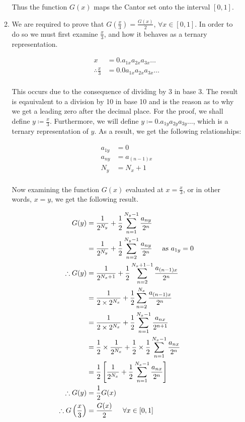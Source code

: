 \documentclass[a4paper]{article}
\begin{document}
\begin{enumerate}[label=\textbf{\arabic*.}]
\begin{enumerate}
		Thus the function $G(x)$ maps the Cantor set onto the interval $[0,1]$.

		\bigbreak

		\item We are required to prove that $G\left(\frac{x}{3}\right) = \frac{G(x)}{2}$, $\forall x \in [0,1]$. In order to do so we must first examine $\frac{x}{3}$, and how it behaves as a ternary representation.

		\begin{align*}
		x & = 0.a_{1x}a_{2x}a_{3x}\dots\\
		\therefore \frac{x}{3} & = 0.0a_{1x}a_{2x}a_{3x}\dots\\
		\end{align*}

		This occurs due to the consequence of dividing by 3 in base 3. The result is eqauivalent to a division by 10 in base 10 and is the reason as to why we get a leading zero after the decimal place. For the proof, we shall define $y \coloneqq \frac{x}{3}$. Furthermore, we will define $y \coloneqq 0.a_{1y}a_{2y}a_{3y}\dots$, which is a ternary representation of $y$. As a result, we get the following relationships:

		\begin{align*}
		a_{1y} & = 0\\
		a_{ny} & = a_{(n-1)x}\\
		N_y & = N_x + 1\\
		\end{align*}

		\pagebreak

		Now examining the function $G(x)$ evaluated at $x=\frac{x}{3}$, or in other words, $x = y$, we get the following result.

		\begin{align*}
		G(y) & = \frac{1}{2^{N_y}} + \frac{1}{2}\sum_{n=1}^{N_y-1}\frac{a_{ny}}{2^{n}}\\
		& = \frac{1}{2^{N_y}} + \frac{1}{2}\sum_{n=2}^{N_y-1}\frac{a_{ny}}{2^{n}} \hspace{5mm} \text{as } a_{1y} = 0\\
		\therefore G(y) & = \frac{1}{2^{N_x + 1}} + \frac{1}{2}\sum_{n=2}^{N_x + 1 -1}\frac{a_{(n-1)x}}{2^{n}}\\
		& = \frac{1}{2\times2^{N_x}} + \frac{1}{2}\sum_{n=2}^{N_x}\frac{a_{(n-1)x}}{2^{n}}\\
		& = \frac{1}{2\times2^{N_x}} + \frac{1}{2}\sum_{n=1}^{N_x-1}\frac{a_{nx}}{2^{n+1}}\\
		& = \frac{1}{2} \times \frac{1}{2^{N_x}} + \frac{1}{2} \times \frac{1}{2}\sum_{n=1}^{N_x-1}\frac{a_{nx}}{2^{n}}\\
		& = \frac{1}{2} \left[\frac{1}{2^{N_x}} + \frac{1}{2}\sum_{n=1}^{N_x-1}\frac{a_{nx}}{2^{n}}\right]\\
		\therefore G(y) & = \frac{1}{2}G(x)\\
		\therefore G\left(\frac{x}{3}\right) & = \frac{G(x)}{2} \hspace{5mm} \forall x \in [0,1]\\
		\end{align*}


\end{enumerate}
\end{enumerate}
\end{document}
